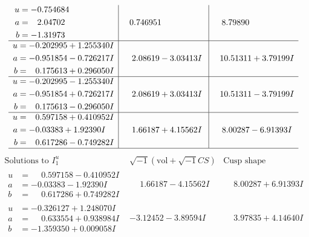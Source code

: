 \documentclass[1p]{elsarticle_modified}
\theoremstyle{definition}
\newcommand{\I}{\sqrt{-1}}
\begin{document}
$$\begin{array}{c|c|c}
\begin{aligned}
u &= -0.754684\phantom{ +0.000000I} \\
a &= \phantom{-}2.04702\phantom{ +0.000000I} \\
b &= -1.31973\phantom{ +0.000000I}\end{aligned}
 & \phantom{-}0.746951\phantom{ +0.000000I} & \phantom{-}8.79890\phantom{ +0.000000I} \\ \hline\begin{aligned}
u &= -0.202995 + 1.255340 I \\
a &= -0.951854 - 0.726217 I \\
b &= \phantom{-}0.175613 + 0.296050 I\end{aligned}
 & \phantom{-}2.08619 - 3.03413 I & \phantom{-}10.51311 + 3.79199 I \\ \hline\begin{aligned}
u &= -0.202995 - 1.255340 I \\
a &= -0.951854 + 0.726217 I \\
b &= \phantom{-}0.175613 - 0.296050 I\end{aligned}
 & \phantom{-}2.08619 + 3.03413 I & \phantom{-}10.51311 - 3.79199 I \\ \hline\begin{aligned}
u &= \phantom{-}0.597158 + 0.410952 I \\
a &= -0.03383 + 1.92390 I \\
b &= \phantom{-}0.617286 - 0.749282 I\end{aligned}
 & \phantom{-}1.66187 + 4.15562 I & \phantom{-}8.00287 - 6.91393 I\\
 \hline 
 \end{array}$$\newpage$$\begin{array}{c|c|c}  
\text{Solutions to }I^u_{1}& \I (\text{vol} + \sqrt{-1}CS) & \text{Cusp shape}\\
 \hline 
\begin{aligned}
u &= \phantom{-}0.597158 - 0.410952 I \\
a &= -0.03383 - 1.92390 I \\
b &= \phantom{-}0.617286 + 0.749282 I\end{aligned}
 & \phantom{-}1.66187 - 4.15562 I & \phantom{-}8.00287 + 6.91393 I \\ \hline\begin{aligned}
u &= -0.326127 + 1.248070 I \\
a &= \phantom{-}0.633554 + 0.938984 I \\
b &= -1.359350 + 0.009058 I\end{aligned}
 & -3.12452 - 3.89594 I & \phantom{-}3.97835 + 4.14640 I \\ \hline\begin{aligned}

\end{aligned}
\end{array}$$
\end{document}
